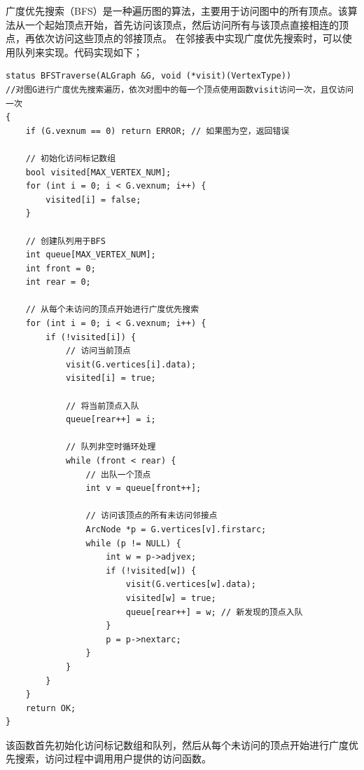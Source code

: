 \documentclass[supercite]{Experimental_Report}
\theoremstyle{definition}
\begin{document}
	广度优先搜索（BFS）是一种遍历图的算法，主要用于访问图中的所有顶点。该算法从一个起始顶点开始，首先访问该顶点，然后访问所有与该顶点直接相连的顶点，再依次访问这些顶点的邻接顶点。
	在邻接表中实现广度优先搜索时，可以使用队列来实现。代码实现如下；
\begin{lstlisting}[caption={广度优先搜索}, label=lst:bfs]
status BFSTraverse(ALGraph &G, void (*visit)(VertexType))
//对图G进行广度优先搜索遍历，依次对图中的每一个顶点使用函数visit访问一次，且仅访问一次
{
    if (G.vexnum == 0) return ERROR; // 如果图为空，返回错误
    
    // 初始化访问标记数组
    bool visited[MAX_VERTEX_NUM];
    for (int i = 0; i < G.vexnum; i++) {
        visited[i] = false;
    }
    
    // 创建队列用于BFS
    int queue[MAX_VERTEX_NUM];
    int front = 0;
    int rear = 0;
    
    // 从每个未访问的顶点开始进行广度优先搜索
    for (int i = 0; i < G.vexnum; i++) {
        if (!visited[i]) {
            // 访问当前顶点
            visit(G.vertices[i].data);
            visited[i] = true;
            
            // 将当前顶点入队
            queue[rear++] = i;
            
            // 队列非空时循环处理
            while (front < rear) {
                // 出队一个顶点
                int v = queue[front++];
                
                // 访问该顶点的所有未访问邻接点
                ArcNode *p = G.vertices[v].firstarc;
                while (p != NULL) {
                    int w = p->adjvex;
                    if (!visited[w]) {
                        visit(G.vertices[w].data);
                        visited[w] = true;
                        queue[rear++] = w; // 新发现的顶点入队
                    }
                    p = p->nextarc;
                }
            }
        }
    }
    return OK;
}
\end{lstlisting}
	该函数首先初始化访问标记数组和队列，然后从每个未访问的顶点开始进行广度优先搜索，访问过程中调用用户提供的访问函数。
\clearpage
\end{document}
